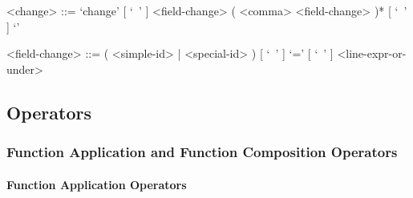 \documentclass{article}
\begin{document}
\begin{itemize}
\begin{grammar}
<change> ::=
`change{' [ `\ ' ] <field-change> ( <comma> <field-change> )* [ `\ ' ] `}'

<field-change> ::=
( <simple-id> | <special-id> ) [ `\ ' ] `=' [ `\ ' ] <line-expr-or-under>
\end{grammar} 

\end{itemize}

\subsection{Operators}

\subsubsection{Function Application and Function Composition Operators}

\paragraph{Function Application Operators}
\end{document}
